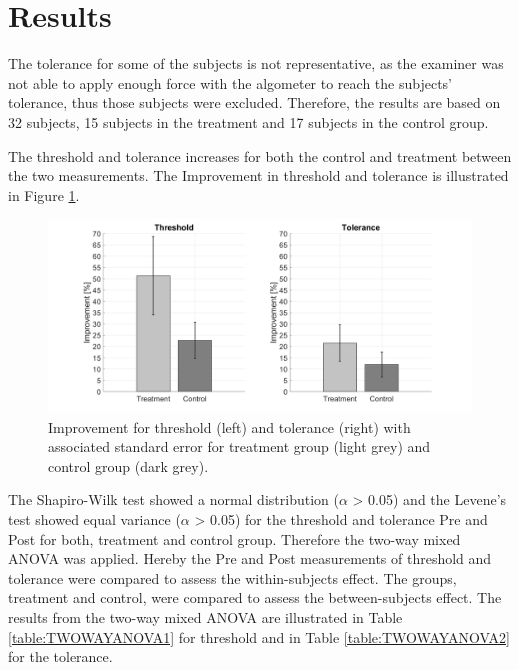 \section{Results}
The tolerance for some of the subjects is not representative, as the examiner was not able to apply enough force with the algometer to reach the subjects' tolerance, thus those subjects were excluded. Therefore,
the results are based on 32 subjects, 15 subjects in the treatment and 17 subjects in the control group. 

The threshold and tolerance increases for both the control and treatment between the two measurements. The Improvement in threshold and tolerance is illustrated in Figure \ref{fig:barplot}. 

\begin{figure}[H]
\centering
\includegraphics[width=1\columnwidth]{../figures/barplot.png}
\caption{Improvement for threshold (left) and tolerance (right) with associated standard error for treatment group (light grey) and control group (dark grey).}
\label{fig:barplot}
\end{figure} 

The Shapiro-Wilk test showed a normal distribution ($\alpha$ > 0.05) and the Levene's test showed equal variance ($\alpha$ > 0.05) for the threshold and tolerance Pre and Post for both, treatment and control group. Therefore the two-way mixed ANOVA was applied. Hereby the Pre and Post measurements of threshold and tolerance were compared to assess the within-subjects effect. The groups, treatment and control, were compared to assess the between-subjects effect. The results from the two-way mixed ANOVA are illustrated in Table \ref{table:TWOWAYANOVA1} for threshold and in Table \ref{table:TWOWAYANOVA2} for the tolerance. 


